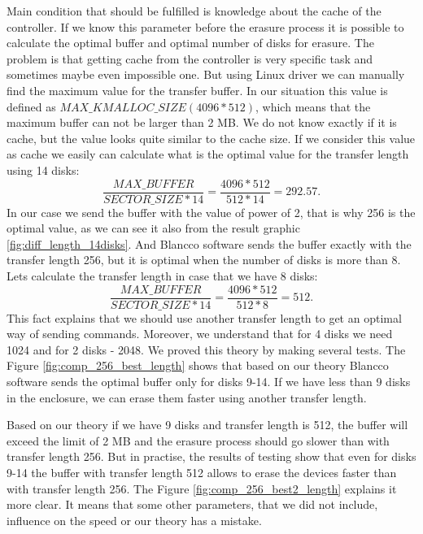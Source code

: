 Main condition that should be fulfilled is knowledge about the cache of the controller. If we know this parameter before the erasure process it is possible to calculate the optimal buffer and optimal number of disks for erasure. The problem is that getting cache from the controller is very specific task and sometimes maybe even impossible one. But using Linux driver we can manually find the maximum value for the transfer buffer. In our situation this value is defined as $MAX\_KMALLOC\_SIZE (4096*512)$, which means that the maximum buffer can not be larger than 2 MB. We do not know exactly if it is cache, but the value looks quite similar to the cache size. If we consider this value as cache we easily can calculate what is the optimal value for the transfer length using 14 disks:
\begin{equation}
	\frac{MAX\_BUFFER}{SECTOR\_SIZE*14} = \frac{4096*512}{512*14} = 292.57.
\end{equation}
In our case we send the buffer with the value of power of 2, that is why 256 is the optimal value, as we can see it also from the result graphic \ref{fig:diff_length_14disks}. And Blancco software sends the buffer exactly with the transfer length 256, but it is optimal when the number of disks is more than 8. Lets calculate the transfer length in case that we have 8 disks:
\begin{equation}
	\frac{MAX\_BUFFER}{SECTOR\_SIZE*14} = \frac{4096*512}{512*8} = 512.
\end{equation}
This fact explains that we should use another transfer length to get an optimal way of sending commands. Moreover, we understand that for 4 disks we need 1024 and for 2 disks - 2048. We proved this theory by making several tests. The Figure \ref{fig:comp_256_best_length} shows that based on our theory Blancco software sends the optimal buffer only for disks 9-14. If we have less than 9 disks in the enclosure, we can erase them faster using another transfer length.

Based on our theory if we have 9 disks and transfer length is 512, the buffer will exceed the limit of 2 MB and the erasure process should go slower than with transfer length 256. But in practise, the results of testing show that even for disks 9-14 the buffer with transfer length 512 allows to erase the devices faster than with transfer length 256. The Figure \ref{fig:comp_256_best2_length} explains it more clear. It means that some other parameters, that we did not include, influence on the speed or our theory has a mistake.




